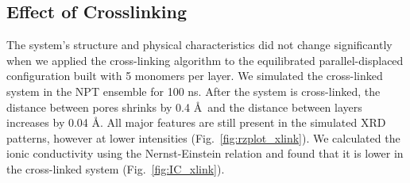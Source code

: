 \documentclass[journal=jpcbfk,manusciprt=article]{achemso}
\begin{document}
  \subsection{Effect of Crosslinking}\label{section:xlink}

  The system's structure and physical characteristics did not change
  significantly when we applied the cross-linking algorithm to the equilibrated
  parallel-displaced configuration built with 5 monomers per layer. We simulated
  the cross-linked system in the NPT ensemble for 100 ns. After the system is
  cross-linked, the distance between pores shrinks by 0.4 \AA~and the distance
  between layers increases by 0.04 \AA. All major features are still present in
  the simulated XRD patterns, however at lower intensities
  (Fig.~\ref{fig:rzplot_xlink}). We calculated the ionic conductivity using the
  Nernst-Einstein relation and found that it is lower in the cross-linked system
  (Fig.~\ref{fig:IC_xlink}).
\end{document}
